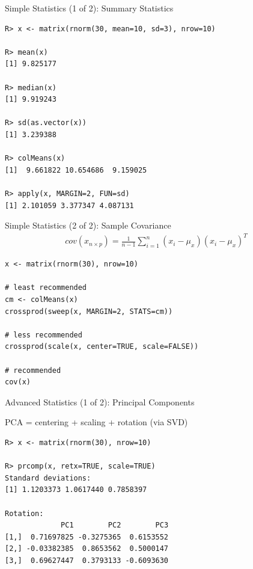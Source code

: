 \begin{frame}[fragile]
  \begin{exampleblock}{Simple Statistics (1 of 2): Summary Statistics}\pause
  \begin{lstlisting}[backgroundcolor=\color{white},basicstyle=\ttfamily\color{dkgray}\scriptsize,keywordstyle=\color{black}, 
  commentstyle=\color{orange},stringstyle=\color{mauve}]
R> x <- matrix(rnorm(30, mean=10, sd=3), nrow=10)

R> mean(x)
[1] 9.825177

R> median(x)
[1] 9.919243

R> sd(as.vector(x))
[1] 3.239388

R> colMeans(x)
[1]  9.661822 10.654686  9.159025

R> apply(x, MARGIN=2, FUN=sd)
[1] 2.101059 3.377347 4.087131
\end{lstlisting}
  \end{exampleblock}
\end{frame}


\begin{frame}[fragile]
  \begin{exampleblock}{Simple Statistics (2 of 2): Sample Covariance}\pause
  \begin{align*}
    cov(x_{n\times p}) = \frac{1}{n-1}\sum_{i=1}^n\left(x_i-\mu_x\right)\left(x_i-\mu_x\right)^T
  \end{align*}
  \begin{lstlisting}
x <- matrix(rnorm(30), nrow=10)

# least recommended
cm <- colMeans(x)
crossprod(sweep(x, MARGIN=2, STATS=cm))

# less recommended
crossprod(scale(x, center=TRUE, scale=FALSE))

# recommended
cov(x)
\end{lstlisting}
  \end{exampleblock}
\end{frame}


\begin{frame}[fragile]
  \begin{exampleblock}{Advanced Statistics (1 of 2): Principal Components}\pause
  \begin{center}
    PCA = centering + scaling + rotation (via SVD)
  \end{center}
  \begin{lstlisting}[backgroundcolor=\color{white},basicstyle=\ttfamily\color{dkgray}\scriptsize,keywordstyle=\color{black}, 
  commentstyle=\color{orange},stringstyle=\color{mauve}]
R> x <- matrix(rnorm(30), nrow=10)

R> prcomp(x, retx=TRUE, scale=TRUE)
Standard deviations:
[1] 1.1203373 1.0617440 0.7858397

Rotation:
             PC1        PC2        PC3
[1,]  0.71697825 -0.3275365  0.6153552
[2,] -0.03382385  0.8653562  0.5000147
[3,]  0.69627447  0.3793133 -0.6093630
\end{lstlisting}
  \end{exampleblock}
\end{frame}

